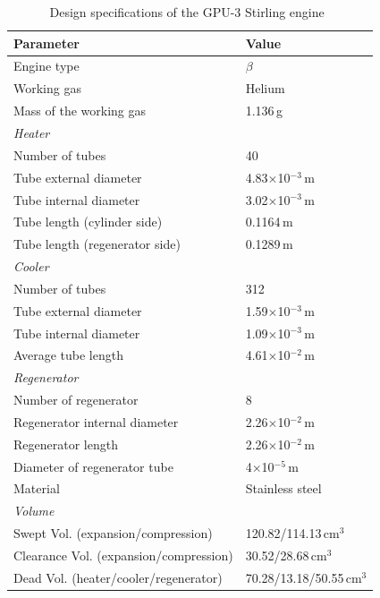 \begin{table}[htbp]\footnotesize
	\caption{Design specifications of the GPU-3 Stirling engine~\cite{Babaelahi2015,Martini1983}}
	\begin{center}
	\begin{tabular}{ll}
		\toprule
		Parameter				&	Value\\
		\midrule
		Engine type					&	$\beta$\\
		Working gas			&	Helium\\
		Mass of the working gas	&	1.136\,g\\
		\emph{Heater}			&\\
		Number of tubes		&	40\\
		Tube external diameter	&	4.83$\times$10$^{-3}\,\mathrm{m}$\\
		Tube internal diameter	&	3.02$\times$10$^{-3}\,\mathrm{m}$\\
		Tube length (cylinder side)&	0.1164\,m\\
		Tube length (regenerator side)		&	0.1289\,m\\
		\emph{Cooler}			&\\
		Number of tubes		&	312\\
		Tube external diameter	&	1.59$\times$10$^{-3}\,\mathrm{m}$\\
		Tube internal diameter	&	1.09$\times$10$^{-3}\,\mathrm{m}$\\
		Average tube length		&	4.61$\times$10$^{-2}\,\mathrm{m}$\\
		\emph{Regenerator}		&\\
		Number of regenerator	&	8\\
		Regenerator internal diameter	&	2.26$\times$10$^{-2}\,\mathrm{m}$\\
		Regenerator length		&	2.26$\times$10$^{-2}\,\mathrm{m}$\\
		Diameter of regenerator tube	&	4$\times$10$^{-5}\,\mathrm{m}$\\
		Material				&	Stainless steel\\
		\emph{Volume}			&\\
		Swept Vol. (expansion/compression)	&	120.82/114.13\,$\mathrm{cm}^3$\\
		Clearance Vol. (expansion/compression)	&	30.52/28.68\,$\mathrm{cm}^3$\\
		Dead Vol. (heater/cooler/regenerator)	&	70.28/13.18/50.55\,$\mathrm{cm}^3$\\
		\bottomrule
	\end{tabular}
	\end{center}
	\label{tab:GPU3parameters}
\end{table}

